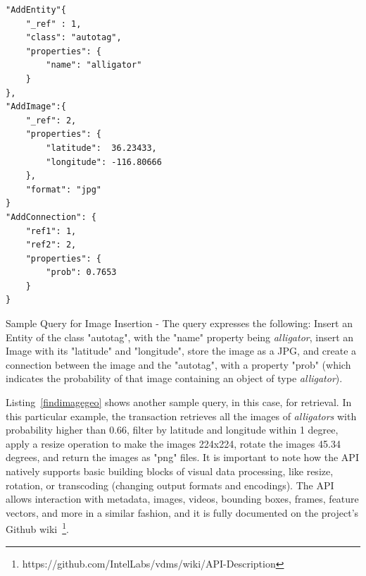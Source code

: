\begin{listing}[ht!]
\begin{verbatim}
"AddEntity"{
    "_ref" : 1,
    "class": "autotag",
    "properties": {
        "name": "alligator"
    }
},
"AddImage":{
    "_ref": 2,
    "properties": {
        "latitude":  36.23433,
        "longitude": -116.80666
    },
    "format": "jpg"
}
"AddConnection": {
    "ref1": 1,
    "ref2": 2,
    "properties": {
        "prob": 0.7653
    }
}

\end{verbatim}
\caption{Sample Query for Image Insertion -
The query expresses the following:
Insert an Entity of the class "autotag", with the "name" property being
\textit{alligator}, insert an Image with its "latitude" and "longitude",
store the image  as a JPG, and create a connection between
the image and the "autotag",  with a property "prob"
(which indicates the probability of that image
containing an object of type  \textit{alligator}).}
\label{addimageandautotag}
\end{listing}

Listing~\ref{findimagegeo} shows another sample query, in this case, for retrieval.
In this particular example, the transaction retrieves all the images
of \textit{alligators} with probability higher than 0.66,
filter by latitude and longitude within 1 degree,
apply a resize operation to make the images 224x224,
rotate the images 45.34 degrees, and return the images as "png" files.
It is important to note how the API natively supports basic building
blocks of visual data processing, like resize, rotation, or transcoding
(changing output formats and encodings).
The API allows interaction with metadata, images, videos, bounding boxes,
frames, feature vectors, and more in a similar fashion,
and it is fully documented on the project's Github
wiki~\footnote{https://github.com/IntelLabs/vdms/wiki/API-Description}.

